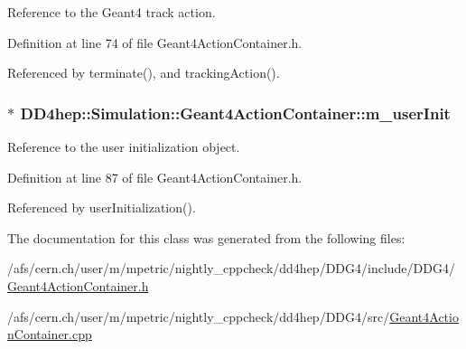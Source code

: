 Reference to the Geant4 track action. 

Definition at line 74 of file Geant4ActionContainer.h.

Referenced by terminate(), and trackingAction().\hypertarget{class_d_d4hep_1_1_simulation_1_1_geant4_action_container_a921172979d5e4b7be0b166f47b67d6fd}{
\subsubsection[{m\_\-userInit}]{$\ast$ {\bf DD4hep::Simulation::Geant4ActionContainer::m\_\-userInit}}}
\label{class_d_d4hep_1_1_simulation_1_1_geant4_action_container_a921172979d5e4b7be0b166f47b67d6fd}


Reference to the user initialization object. 

Definition at line 87 of file Geant4ActionContainer.h.

Referenced by userInitialization().

The documentation for this class was generated from the following files:\begin{DoxyCompactItemize}
\item 
/afs/cern.ch/user/m/mpetric/nightly\_\-cppcheck/dd4hep/DDG4/include/DDG4/\hyperlink{_geant4_action_container_8h}{Geant4ActionContainer.h}\item 
/afs/cern.ch/user/m/mpetric/nightly\_\-cppcheck/dd4hep/DDG4/src/\hyperlink{_geant4_action_container_8cpp}{Geant4ActionContainer.cpp}\end{DoxyCompactItemize}
